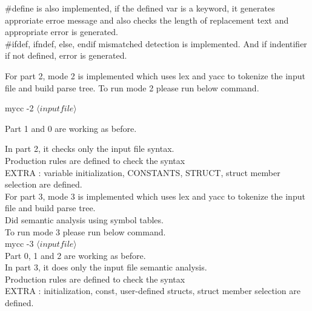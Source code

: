 \documentclass{article}
\begin{document}
$\#$define is also implemented, if the defined var is a keyword, it generates approriate erroe message and also checks the length of replacement text and appropriate error is generated. \\

$\#$ifdef, ifndef, else, endif mismatched detection is implemented.
And if indentifier if not defined,  error is generated.

For part 2,  mode 2 is implemented which uses lex and yacc to tokenize the input file and build parse tree. To run mode 2 please run below command.

mycc -2 $\langle input file\rangle$

Part 1 and 0 are working as before.

In part 2, it checks only the input file syntax.  \\
Production rules are defined to check the syntax \\
EXTRA : variable initialization, CONSTANTS, STRUCT, struct member selection are defined. \\

For part 3,  mode 3 is implemented which uses lex and yacc to tokenize the input file and build parse tree. \\
Did semantic analysis using symbol tables. \\

To run mode 3 please run below command. \\

mycc -3  $\langle input file\rangle$ \\

Part 0, 1 and 2 are working as before. \\

In part 3, it does only the input file semantic analysis. \\
Production rules are defined to check the syntax \\
EXTRA :  initialization, const, user-defined structs, struct member selection are defined. \\
\end{document}
